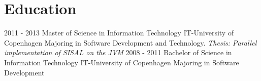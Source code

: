 \documentclass[]{friggeri-cv}
\begin{document}
\section{Education}
\begin{entrylist}
  \entry
    {2011 - 2013}
    {Master of Science in Information Technology}
    {IT-University of Copenhagen}
    {Majoring in Software Development and Technology.\newline
    {\textit{Thesis: Parallel implementation of SISAL on the JVM}}
    }
  \entry
    {2008 - 2011}
    {Bachelor of Science in Information Technology}
    {IT-University of Copenhagen}
    {Majoring in Software Development}
\end{entrylist}
\end{document}
